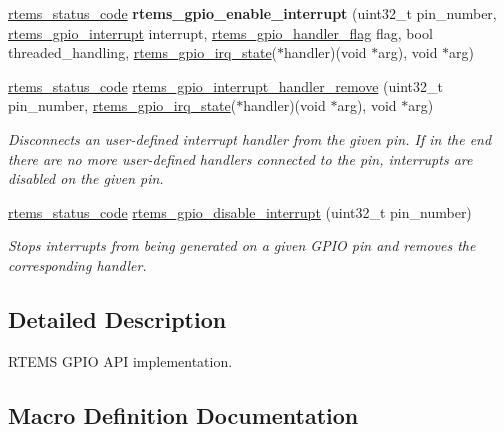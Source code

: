\begin{DoxyCompactItemize}
\mbox{\hyperlink{group__ClassicStatus_ga545d41846817eaba6143d52ee4d9e9fe}{rtems\+\_\+status\+\_\+code}} {\bfseries rtems\+\_\+gpio\+\_\+enable\+\_\+interrupt} (uint32\+\_\+t pin\+\_\+number, \mbox{\hyperlink{gpio_8h_a941c7497a28a335b0b05e1ebfd471ddc}{rtems\+\_\+gpio\+\_\+interrupt}} interrupt, \mbox{\hyperlink{gpio_8h_a5c0bd60f2caeb36c424b17c888331b8f}{rtems\+\_\+gpio\+\_\+handler\+\_\+flag}} flag, bool threaded\+\_\+handling, \mbox{\hyperlink{gpio_8h_a22ef6f3b12eae878a51eaf96f72437ea}{rtems\+\_\+gpio\+\_\+irq\+\_\+state}}($\ast$handler)(void $\ast$arg), void $\ast$arg)
\item 
\mbox{\hyperlink{group__ClassicStatus_ga545d41846817eaba6143d52ee4d9e9fe}{rtems\+\_\+status\+\_\+code}} \mbox{\hyperlink{gpio-support_8c_a5d7e7afe399c24b0811c83aab49cd185}{rtems\+\_\+gpio\+\_\+interrupt\+\_\+handler\+\_\+remove}} (uint32\+\_\+t pin\+\_\+number, \mbox{\hyperlink{gpio_8h_a22ef6f3b12eae878a51eaf96f72437ea}{rtems\+\_\+gpio\+\_\+irq\+\_\+state}}($\ast$handler)(void $\ast$arg), void $\ast$arg)
\begin{DoxyCompactList}\small\item\em Disconnects an user-\/defined interrupt handler from the given pin. If in the end there are no more user-\/defined handlers connected to the pin, interrupts are disabled on the given pin. \end{DoxyCompactList}\item 
\mbox{\hyperlink{group__ClassicStatus_ga545d41846817eaba6143d52ee4d9e9fe}{rtems\+\_\+status\+\_\+code}} \mbox{\hyperlink{gpio-support_8c_a37a34750be9379637427ea4345d46259}{rtems\+\_\+gpio\+\_\+disable\+\_\+interrupt}} (uint32\+\_\+t pin\+\_\+number)
\begin{DoxyCompactList}\small\item\em Stops interrupts from being generated on a given G\+P\+IO pin and removes the corresponding handler. \end{DoxyCompactList}\end{DoxyCompactItemize}


\subsection{Detailed Description}
R\+T\+E\+MS G\+P\+IO A\+PI implementation. 



\subsection{Macro Definition Documentation}
\mbox{\label{gpio-support_8c_a7e430e4dc89076ebb4da24bc25ba7566}} 
